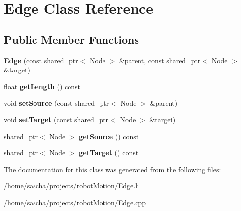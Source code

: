 \hypertarget{class_edge}{\section{Edge Class Reference}
\label{class_edge}
}
\subsection*{Public Member Functions}
\begin{DoxyCompactItemize}
\item 
\hypertarget{class_edge_a932433a5fb3c63570fab7e1d284b696e}{{\bfseries Edge} (const shared\-\_\-ptr$<$ \hyperlink{class_node}{Node} $>$ \&parent, const shared\-\_\-ptr$<$ \hyperlink{class_node}{Node} $>$ \&target)}\label{class_edge_a932433a5fb3c63570fab7e1d284b696e}

\item 
\hypertarget{class_edge_a462dd2f23cec48d0bd6cce8c5d2a047c}{float {\bfseries get\-Length} () const }\label{class_edge_a462dd2f23cec48d0bd6cce8c5d2a047c}

\item 
\hypertarget{class_edge_a4e332dd4630fd74542ac796e6d03924d}{void {\bfseries set\-Source} (const shared\-\_\-ptr$<$ \hyperlink{class_node}{Node} $>$ \&parent)}\label{class_edge_a4e332dd4630fd74542ac796e6d03924d}

\item 
\hypertarget{class_edge_a6e67c0858411eb3512a70cfd163bff3b}{void {\bfseries set\-Target} (const shared\-\_\-ptr$<$ \hyperlink{class_node}{Node} $>$ \&target)}\label{class_edge_a6e67c0858411eb3512a70cfd163bff3b}

\item 
\hypertarget{class_edge_a34fefe8472e7547e521054c402a65758}{shared\-\_\-ptr$<$ \hyperlink{class_node}{Node} $>$ {\bfseries get\-Source} () const }\label{class_edge_a34fefe8472e7547e521054c402a65758}

\item 
\hypertarget{class_edge_a44b1853be0f01178cd11be8811482fa2}{shared\-\_\-ptr$<$ \hyperlink{class_node}{Node} $>$ {\bfseries get\-Target} () const }\label{class_edge_a44b1853be0f01178cd11be8811482fa2}

\end{DoxyCompactItemize}


The documentation for this class was generated from the following files\-:\begin{DoxyCompactItemize}
\item 
/home/sascha/projects/robot\-Motion/Edge.\-h\item 
/home/sascha/projects/robot\-Motion/Edge.\-cpp\end{DoxyCompactItemize}
